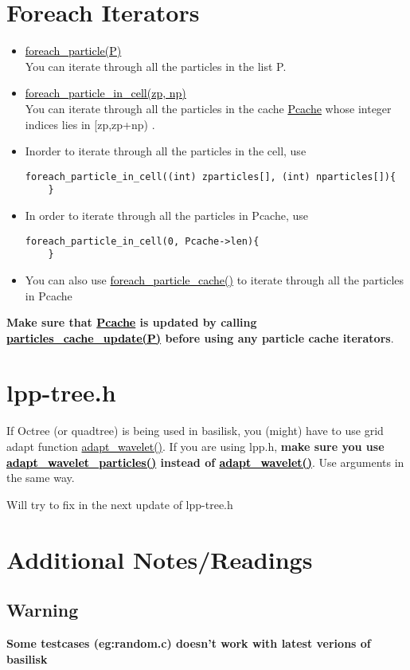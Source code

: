 \documentclass[a4paper,12pt]{article}
\newcommand{\fname}[1]{\textcolor{black}{\underline{#1}}}
\begin{document}
    \section{Foreach Iterators}
    \begin{itemize}
        \item \fname{foreach\_particle(P)} \\
        You can iterate through all the particles in the list P.
        \item \fname{foreach\_particle\_in\_cell(zp, np)} \\
        You can iterate through all the particles in the cache \fname{Pcache} whose integer indices lies in [zp,zp+np) .
        \item Inorder to iterate through all the particles in the cell, use
        \begin{lstlisting}[style=CStyle]
    foreach_particle_in_cell((int) zparticles[], (int) nparticles[]){
    }   \end{lstlisting}
        \item In order to iterate through all the particles in Pcache, use    \begin{lstlisting}[style=CStyle]
    foreach_particle_in_cell(0, Pcache->len){
    }    \end{lstlisting}
        \item You can also use \fname{foreach\_particle\_cache()} to iterate through all the particles in Pcache
    \end{itemize}
    \textbf{Make sure that \fname{Pcache} is updated by calling  \fname{particles\_cache\_update(P)} before using any particle cache iterators}.
    
    \section{lpp-tree.h}
    If Octree (or quadtree) is being used in basilisk, you (might) have to use grid adapt function \fname{adapt\_wavelet()}. If you are using lpp.h, \textbf{make sure you use 
    \fname{adapt\_wavelet\_particles()} instead of \fname{adapt\_wavelet()}}. Use arguments in the  same way. 
    
    Will try to fix in the next update of lpp-tree.h
    
    \section{Additional Notes/Readings}
    \subsection{Warning}
    \textbf{Some testcases (eg:random.c) doesn't work with latest verions of basilisk}
    
\end{document}
